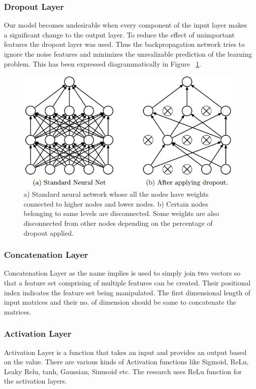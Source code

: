   \subsubsection{Dropout Layer}
  Our model becomes undesirable when every component of the input layer makes a significant change to the output layer. To reduce the effect of unimportant features the dropout layer was used. Thus the backpropagation network tries to ignore the noise features and minimizes the unrealizable prediction of the learning problem. This has been expressed diagrammatically in Figure ~\ref{fig:dropout}.
  \begin{figure}
    [H] \centering
    \captionsetup{justification=justified}
    \includegraphics[width=.5\linewidth]{mainmatter/3-Methodology/images/dropout.jpeg}
    \caption[Dropout Layer]{a) Standard neural network whose all the nodes have weights connected to higher nodes and lower nodes. 
    b) Certain nodes belonging to same levels are disconnected. Some weights are also disconnected from other nodes depending on the percentage of dropout applied.}
    \label{fig:dropout}
  
  \end{figure}
  
  
  
  \subsubsection{Concatenation Layer}
  Concatenation Layer as the name implies is used to simply join two vectors so that a feature set comprising of multiple features can be created. Their positional index indicates the feature set being manipulated. The first dimensional length of input matrices and their no. of dimension should be same to concatenate the matrices.

  \subsubsection{Activation Layer}
  
  Activation Layer is a function that takes an input and provides an output based on the value. There are various kinds of Activation functions like Sigmoid, ReLu, Leaky Relu, tanh, Gaussian, Sinusoid etc. The research uses ReLu function for the activation layers.
  
